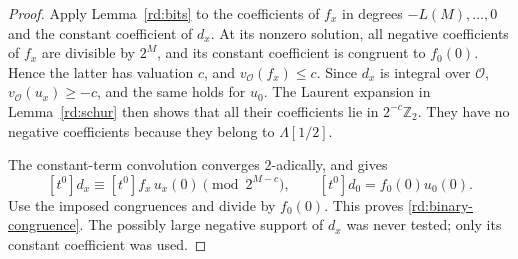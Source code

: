 \begin{proof}
Apply Lemma~\ref{rd:bits} to the coefficients
of \(f_x\) in degrees \(-L(M),\ldots,0\)
and the constant coefficient of \(d_x\).
At its nonzero solution, all negative
coefficients of \(f_x\) are divisible by
\(2^M\), and its constant coefficient is
congruent to \(f_0(0)\).  Hence the latter
has valuation \(c\), and
\(v_{\mathcal O}(f_x)\le c\).
Since \(d_x\) is integral over \(\mathcal O\),
\(v_{\mathcal O}(u_x)\ge-c\), and the same
holds for \(u_0\).  The Laurent expansion
in Lemma~\ref{rd:schur} then shows that all
their coefficients lie in \(2^{-c}\mathbb Z_2\).
They have no negative coefficients because
they belong to \(\Lambda[1/2]\).

The constant-term convolution converges
\(2\)-adically, and gives
\[
 [t^0]d_x\equiv [t^0]f_x\,u_x(0)
                          \pmod{2^{M-c}},
 \qquad
 [t^0]d_0=f_0(0)u_0(0).
 \]
Use the imposed congruences and divide by
\(f_0(0)\).  This proves
\eqref{rd:binary-congruence}.  The possibly
large negative support of \(d_x\) was never
tested; only its constant coefficient was used.
\end{proof}

